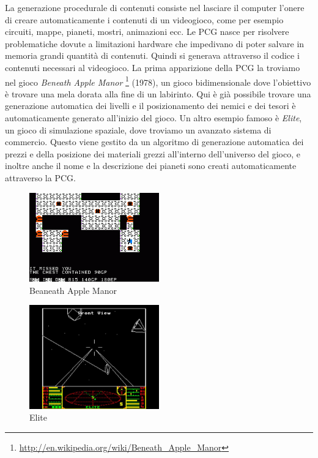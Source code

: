 \documentclass[12pt, italian]{toptesi}
\begin{document}
La generazione procedurale di contenuti consiste nel lasciare il computer l'onere di creare automaticamente i contenuti di un videogioco, come per esempio circuiti, mappe, pianeti, mostri, animazioni ecc.
Le PCG nasce per risolvere problematiche dovute a limitazioni hardware che impedivano di poter salvare in memoria grandi quantità di contenuti.
Quindi si generava attraverso il codice i contenuti necessari al videogioco.
La prima apparizione della PCG la troviamo nel gioco \emph{Beneath Apple Manor} \footnote{\url{http://en.wikipedia.org/wiki/Beneath_Apple_Manor}} (1978),
un gioco bidimensionale dove l'obiettivo è trovare una mela dorata alla fine di un labirinto.
Qui è già possibile trovare una generazione automatica dei livelli e il posizionamento dei nemici e dei tesori è automaticamente generato all'inizio del gioco.
Un altro esempio famoso è \emph{Elite}, un gioco di simulazione spaziale, dove troviamo un avanzato sistema di commercio. Questo viene gestito da un algoritmo di generazione automatica dei prezzi e della posizione dei materiali grezzi all'interno dell'universo del gioco, e inoltre anche il nome e la descrizione dei pianeti sono creati automaticamente attraverso la PCG.
\begin{figure}
\centering
\includegraphics[width=0.5\textwidth]{beneath_apple_manor}
\caption{Beaneath Apple Manor}
\label{fig:beneath_apple_manor}
\end{figure}
\begin{figure}
\centering
\includegraphics[width=0.5\textwidth]{elite}
\caption{Elite}
\label{fig:elite}
\end{figure}
\end{document}
